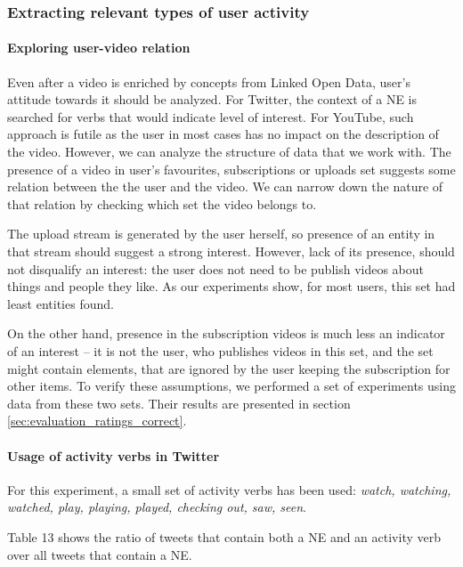 \subsubsection{Extracting relevant types of user activity}

\paragraph{Exploring user-video relation} Even after a video is enriched by
concepts from Linked Open Data, user's attitude towards it should be analyzed.
For Twitter, the context of a NE is searched for verbs that would indicate
level of interest. For YouTube, such approach is futile as the user in most
cases has no impact on the description of the video. However, we can analyze
the structure of data that we work with. The presence of a video in
user's favourites, subscriptions or uploads set suggests some relation between
the the user and the video. We can narrow down the nature of that relation by
checking which set the video belongs to.

The upload stream is generated by the user herself, so presence of an entity in
that stream should suggest a strong interest. However, lack of its presence, should not
disqualify an interest: the user does not need to be publish videos about things
and people they like. As our experiments show, for most users, this set had least
entities found.

On the other hand, presence in the subscription videos is much less an
indicator of an interest -- it is not the user, who publishes videos in this
set, and the set might contain elements, that are ignored by the user keeping
the subscription for other items. To verify these assumptions, we performed a
set of experiments using data from these two sets. Their results are presented
in section \ref{sec:evaluation_ratings_correct}.

\paragraph{Usage of activity verbs in Twitter}
For this experiment, a small set of activity verbs has been used: \textit{watch, watching, watched,
play, playing, played, checking out, saw, seen}.

Table 13 shows the ratio of tweets that contain both a NE and an activity verb over all
tweets that contain a NE.

